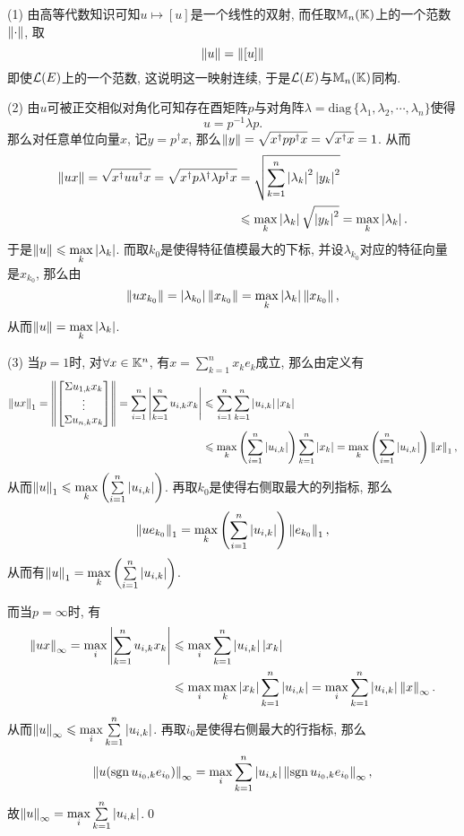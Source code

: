 	\begin{Proof}
	(1) 由高等代数知识可知$ u\mapsto[u] $是一个线性的双射, 而任取$ \mathbb{M}_n(\mathbb{K}) $上的一个范数$ \left\| \cdot \right\| $, 取
	\[
	\left\| u \right\|=\left\| [u] \right\|
	\]
	即使$ \mathcal{L}(E) $上的一个范数, 这说明这一映射连续, 于是$ \mathcal{L}(E) $与$ \mathbb{M}_n(\mathbb{K}) $同构.
	
	(2) 由$ u $可被正交相似对角化可知存在酉矩阵$ p $与对角阵$ \lambda=\mathrm{diag}\,\{ \lambda_1,\lambda_2,\cdots,\lambda_n \} $使得
	\[
	u=p^{-1}\lambda p.
	\]
	那么对任意单位向量$ x $, 记$ y=p^\dagger x $, 那么$ \left\| y \right\|=\sqrt{x^\dagger pp^\dagger x}=\sqrt{x^\dagger x}=1 $. 从而
	\begin{align*}
	\left\| ux \right\|=\sqrt{x^\dagger uu^\dagger x}=\sqrt{x^\dagger p\lambda^\dagger\lambda p^\dagger x}&=\sqrt{\sum_{k=1}^n\left| \lambda_k \right| ^2\left| y_k \right| ^2}\\
	&\leqslant\max_{k}\left| \lambda_k \right| \sqrt{\left| y_k \right| ^2}=\max_{k}\left| \lambda_k \right| .
	\end{align*}
	于是$ \left\| u \right\|\leqslant\max\limits_{k}\left| \lambda_k \right|  $. 而取$ k_0 $是使得特征值模最大的下标, 并设$ \lambda_{k_0} $对应的特征向量是$ x_{k_0} $, 那么由
	\[
	\left\| ux_{k_0} \right\|=\left| \lambda_{k_0} \right| \left\| x_{k_0} \right\|=\max_{k}\left| \lambda_k \right| \left\| x_{k_0} \right\|,
	\]
	从而$ \left\| u \right\|=\max\limits_{k}\left| \lambda_k \right|  $.
	
	(3) 当$ p=1 $时, 对$ \forall x\in\mathbb{K}^n $, 有$ x=\sum\limits_{k=1}^n x_ke_k $成立, 那么由定义有
	\begin{align*}
	\left\| ux \right\|_1=\left\| \begin{bmatrix}
	\Sigma u_{1,k}x_k\\\vdots\\\Sigma u_{n,k}x_k
	\end{bmatrix} \right\|=\sum_{i=1}^n\left| \sum_{k=1}^nu_{i,k}x_k \right| &\leqslant\sum_{i=1}^n\sum_{k=1}^n\left| u_{i,k} \right| \left| x_k \right| \\
	&\leqslant\max_{k}\left(\sum_{i=1}^n\left| u_{i,k} \right| \right)\sum_{k=1}^n\left| x_k \right| =\max_{k}\left(\sum_{i=1}^n\left| u_{i,k} \right| \right)\left\| x \right\|_1,
	\end{align*}
	从而$ \left\| u \right\|_1\leqslant\max\limits_{k}\left(\sum\limits_{i=1}^n\left| u_{i,k} \right| \right) $. 再取$ k_0 $是使得右侧取最大的列指标, 那么
	\[
	\left\| ue_{k_0} \right\|_1=\max_{k}\left(\sum_{i=1}^n\left| u_{i,k} \right| \right)\left\| e_{k_0} \right\|_1,
	\]
	从而有$ \left\| u \right\|_1=\max\limits_{k}\left(\sum\limits_{i=1}^n\left| u_{i,k} \right| \right) $.
	
	而当$ p=\infty $时, 有
	\begin{align*}
	\left\| ux \right\|_\infty=\max_i\left| \sum_{k=1}^nu_{i,k}x_k \right| &\leqslant\max_i\sum_{k=1}^n\left| u_{i,k} \right| \left| x_k \right| \\
	&\leqslant\max_i\max_k\left| x_k \right| \sum_{k=1}^n\left| u_{i,k} \right| =\max_i\sum_{k=1}^n\left| u_{i,k} \right| \left\| x \right\|_\infty.
	\end{align*}
	从而$ \left\| u \right\|_\infty\leqslant\max\limits_i\sum\limits_{k=1}^n\left| u_{i,k} \right|  $. 再取$ i_0 $是使得右侧最大的行指标, 那么
	\[
	\left\| u(\mathrm{sgn}\,u_{i_0,k}e_{i_0}) \right\|_\infty=\max_i\sum_{k=1}^n\left| u_{i,k} \right| \left\| \mathrm{sgn}\,u_{i_0,k}e_{i_0} \right\|_\infty,
	\]
	故$ \left\| u \right\|_\infty=\max\limits_i\sum\limits_{k=1}^n\left| u_{i,k} \right|  $.\qed
	\end{Proof}
	
